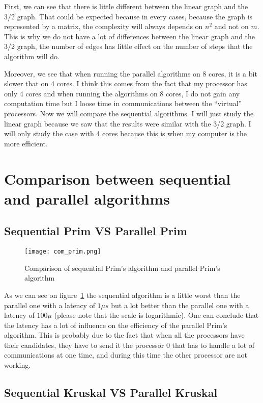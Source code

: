 \documentclass[
10pt, %
a4paper, %
oneside, %
headinclude,footinclude, %
BCOR5mm, %
]{scrartcl}
\begin{document}
First, we can see that there is little different between the linear
graph and the 3/2 graph. That could be expected because in every
cases, because the graph is represented by a matrix, the complexity
will always depends on $n^2$ and not on $m$. This is why we do not
have a lot of differences between the linear graph and the $3/2$
graph, the number of edges has little effect on the number of steps
that the algorithm will do.

Moreover, we see that when running the parallel algorithms on 8 cores,
it is a bit slower that on 4 cores. I think this comes from the fact
that my processor has only 4 cores and when running the algorithms on
8 cores, I do not gain any computation time but I loose time in communications
between the ``virtual'' processors. Now we will compare the sequential
algorithms. I will just study the linear graph because we saw that the
results were similar with the 3/2 graph. I will only study the case
with 4 cores because this is when my computer is the more efficient.

\section{Comparison between sequential and parallel algorithms}

\subsection{Sequential Prim VS Parallel Prim}
\begin{figure}
  \centering
  \texttt{[image: com\_prim.png]}
  \caption{Comparison of sequential Prim's algorithm and parallel
    Prim's algorithm}
  \label{fig:comp_prim}
\end{figure}

As we can see on figure~\ref{fig:comp_prim} the sequential algorithm
is a little worst than the parallel one with a latency of $1\mu s$ but
a lot better than the parallel one with a latency of $100 \mu$ (please
note that the scale is logarithmic). One can conclude that the latency
has a lot of influence on the efficiency of the parallel Prim's
algorithm. This is probably due to the fact that when all the
processors have their candidates, they have to send it the processor 0
that has to handle a lot of communications at one time, and during
this time the other processor are not working.

\subsection{Sequential Kruskal VS Parallel Kruskal}
\end{document}
